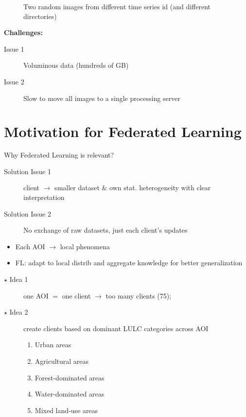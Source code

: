 \documentclass[aspectratio=169,xcolor=dvipsnames]{beamer}
\begin{document}
\begin{frame}
\begin{figure}[ht]
\begin{subfigure}[b]{0.45\textwidth}
        \caption{}
        \label{fig:image2}
    \end{subfigure}
    \caption{Two random images from different time series id (and different directories)}
    \label{fig:sidebyside}
\end{figure}
\textbf{Challenges:}
\begin{description}
    \item[Issue 1] Voluminous data (hundreds of GB)
    \item[Issue 2] Slow to move all images to a single processing server
\end{description}
\end{frame}

\section{Motivation for Federated Learning}

\begin{frame}{Why Federated Learning is relevant?}
\begin{description}
    \item[Solution Issue 1] client $\to$ smaller dataset $\&$ own stat. heterogeneity with clear interpretation
    \item[Solution Issue 2] No exchange of raw datasets, just each client's updates
\end{description}
\begin{itemize}
    \item Each AOI $\to$ local phenomena
    \item FL: adapt to local distrib and aggregate knowledge for better generalization
\end{itemize}
\begin{description}
    \item[$\star$ Idea 1] one AOI $=$ one client $\to$ too many clients (75);
    \item[$\star$ Idea 2] create clients based on dominant LULC categories across AOI
    \begin{enumerate}
        \item Urban areas
        \item Agricultural areas
        \item Forest-dominated areas
        \item Water-dominated areas
        \item Mixed land-use areas
    \end{enumerate}
\end{description}
\end{frame}
\end{document}
